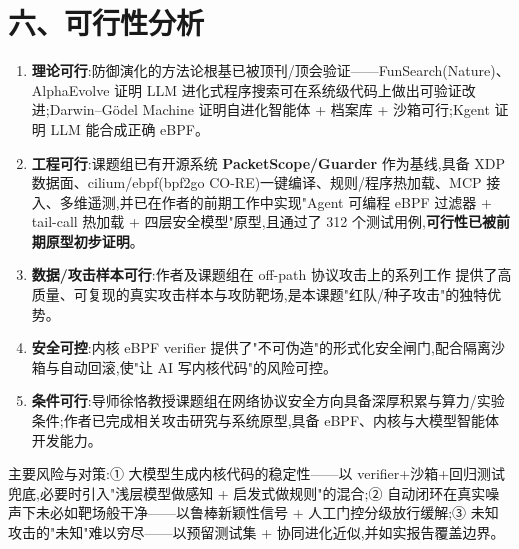 \section*{六、可行性分析}
\begin{enumerate}[leftmargin=2em,itemsep=1pt,topsep=2pt]
  \item \textbf{理论可行}:防御演化的方法论根基已被顶刊/顶会验证——FunSearch(Nature)\supercite{romeraparedes2024funsearch}、AlphaEvolve\supercite{novikov2025alphaevolve} 证明 LLM 进化式程序搜索可在系统级代码上做出可验证改进;Darwin–Gödel Machine\supercite{zhang2025dgm} 证明自进化智能体 + 档案库 + 沙箱可行;Kgent\supercite{yang2024kgent} 证明 LLM 能合成正确 eBPF。
  \item \textbf{工程可行}:课题组已有开源系统 \textbf{PacketScope/Guarder} 作为基线,具备 XDP 数据面、cilium/ebpf(bpf2go CO-RE)一键编译、规则/程序热加载、MCP 接入、多维遥测,并已在作者的前期工作中实现"Agent 可编程 eBPF 过滤器 + tail-call 热加载 + 四层安全模型"原型,且通过了 312 个测试用例,\textbf{可行性已被前期原型初步证明}。
  \item \textbf{数据/攻击样本可行}:作者及课题组在 off-path 协议攻击上的系列工作\supercite{feng2025cacm,feng2020mixedipid,feng2022pmtud,feng2025pmtudisolation,yang2024natwifi,wang2025packetsize} 提供了高质量、可复现的真实攻击样本与攻防靶场,是本课题"红队/种子攻击"的独特优势。
  \item \textbf{安全可控}:内核 eBPF verifier 提供了"不可伪造"的形式化安全闸门,配合隔离沙箱与自动回滚,使"让 AI 写内核代码"的风险可控。
  \item \textbf{条件可行}:导师徐恪教授课题组在网络协议安全方向具备深厚积累与算力/实验条件;作者已完成相关攻击研究与系统原型,具备 eBPF、内核与大模型智能体开发能力。
\end{enumerate}
主要风险与对策:① 大模型生成内核代码的稳定性——以 verifier+沙箱+回归测试兜底,必要时引入"浅层模型做感知 + 启发式做规则"的混合;② 自动闭环在真实噪声下未必如靶场般干净——以鲁棒新颖性信号 + 人工门控分级放行缓解;③ 未知攻击的"未知"难以穷尽——以预留测试集 + 协同进化近似,并如实报告覆盖边界。

